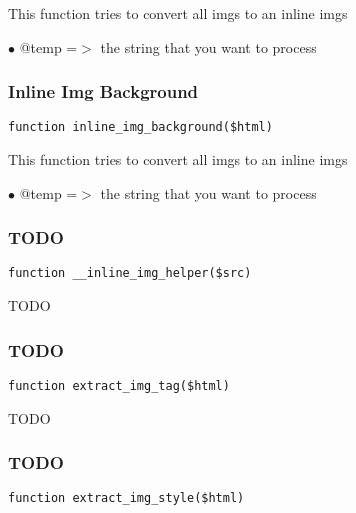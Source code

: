 \documentclass[a4paper]{article}
\begin{document}
This function tries to convert all imgs to an inline imgs

\begin{compactitem}
\item[\color{myblue}$\bullet$] @temp =$>$ the string that you want to process
\end{compactitem}

\hypertarget{toc116}{}
\subsubsection{Inline Img Background}

\begin{lstlisting}
function inline_img_background($html)
\end{lstlisting}

This function tries to convert all imgs to an inline imgs

\begin{compactitem}
\item[\color{myblue}$\bullet$] @temp =$>$ the string that you want to process
\end{compactitem}

\hypertarget{toc117}{}
\subsubsection{TODO}

\begin{lstlisting}
function __inline_img_helper($src)
\end{lstlisting}

TODO

\hypertarget{toc118}{}
\subsubsection{TODO}

\begin{lstlisting}
function extract_img_tag($html)
\end{lstlisting}

TODO

\hypertarget{toc119}{}
\subsubsection{TODO}

\begin{lstlisting}
function extract_img_style($html)
\end{lstlisting}
\end{document}
